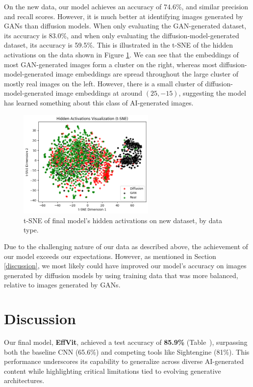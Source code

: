 \documentclass{article} %
\begin{document}
On the new data, our model achieves an accuracy of 74.6\%, and similar precision and recall scores. However, it is much better at identifying images generated by GANs than diffusion models. When only evaluating the GAN-generated dataset, its accuracy is 83.0\%, and when only evaluating the diffusion-model-generated dataset, its accuracy is 59.5\%. This is illustrated in the t-SNE of the hidden activations on the data shown in Figure \ref{fig:new_data_tsne}. We can see that the embeddings of most GAN-generated images form a cluster on the right, whereas most diffusion-model-generated image embeddings are spread throughout the large cluster of mostly real images on the left. However, there is a small cluster of diffusion-model-generated image embeddings at around $(25, -15)$, suggesting the model has learned something about this class of AI-generated images.

\begin{figure}[h]
    \begin{center}
        \includegraphics[width=0.6\textwidth]{figs/tsne.png}
    \end{center}
    \caption{t-SNE of final model's hidden activations on new dataset, by data type.}
    \label{fig:new_data_tsne}
\end{figure}

Due to the challenging nature of our data as described above, the achievement of our model exceeds our expectations. However, as mentioned in Section \ref{discussion}, we most likely could have improved our model's accuracy on images generated by diffusion models by using training data that was more balanced, relative to images generated by GANs.

\section{Discussion}
Our final model, \textbf{EffVit}, achieved a test accuracy of \textbf{85.9\%} (Table~), surpassing both the baseline CNN (65.6\%) and competing tools like Sightengine (81\%). This performance underscores its capability to generalize across diverse AI-generated content while highlighting critical limitations tied to evolving generative architectures.
\end{document}
